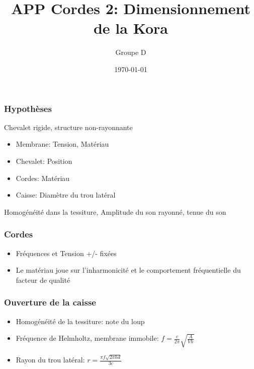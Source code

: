 

\title[]{APP Cordes 2: Dimensionnement de la Kora} %

\author{Groupe D} %
\medskip
\date{\today} %



\begin{frame}
\titlepage %
\end{frame}

\begin{frame}
  \frametitle{Hypothèses}
  Chevalet rigide, structure non-rayonnante
  \begin{itemize}
    \item{Membrane:} Tension, Matériau
    \item{Chevalet:} Position 
    \item{Cordes:} Matériau
    \item{Caisse:} Diamètre du trou latéral
  \end{itemize}

  Homogénéité dans la tessiture, Amplitude du son rayonné, tenue du son
\end{frame}

\begin{frame}
  \frametitle{Cordes}
  \begin{itemize}
    \item Fréquences et Tension +/- fixées
    \item Le matériau joue sur l'inharmonicité et le comportement fréquentielle
      du facteur de qualité
  \end{itemize}
\end{frame}

\begin{frame}
  \frametitle{Ouverture de la caisse}
  \begin{itemize}
    \item Homogénéité de la tessiture: note du loup
    \item Fréquence de Helmholtz, membrane immobile: $ f =\frac{c}{2\pi} \sqrt{\frac{A}{V h}}$
    \item Rayon du trou latéral: $r = \frac{\pi f \sqrt{2 \pi h d}}{3c}$
    \end{itemize}
\end{frame}

